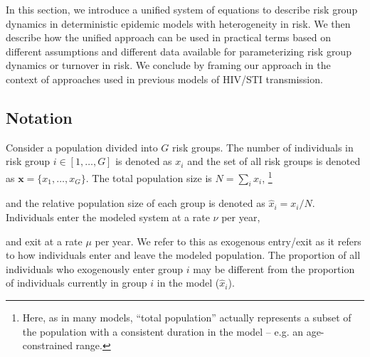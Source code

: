 In this section, we introduce a unified system of equations 
to describe risk group dynamics %
in deterministic epidemic models with heterogeneity in risk.
We then describe how the unified approach can be used in practical terms based on 
different assumptions and different data available for parameterizing risk group dynamics or turnover in risk. %
We conclude by framing our approach in the context of approaches used in previous models of HIV/STI transmission. %
\subsection{Notation}
Consider a population divided into $G$ risk groups.
The number of individuals in risk group $i \in [1, \dots, G]$ is denoted as $x_i$
and the set of all risk groups is denoted as $\bm{x} = \{x_1, \dots, x_G\}$.
The total population size is $N = \sum_i {x_i}$,%
\footnote{Here, as in many models, ``total population'' actually represents  %
  a subset of the population with a consistent duration in the model --
  e.g. an age-constrained range.}
  
and the relative population size of each group 
is denoted as $\hat{x}_i = x_i / N$.
Individuals enter the modeled system at a rate $\nu$ per year,  %

and exit at a rate $\mu$ per year. We refer to this as exogenous entry/exit as it refers to how individuals enter and leave the modeled population.
The proportion of all individuals who exogenously enter group $i$ 
may be different from
the proportion of individuals currently in group $i$ in the model ($\hat{x}_i$). %

